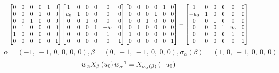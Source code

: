\documentclass[11pt]{article}
\theoremstyle{definition}
\begin{document}
\[
\scaletoalign{\textwidth}{{\left[\begin{matrix}0 & 0 & 0 & 0 & 1 & 0\\0 & 0 & 0 & 1 & 0 & 0\\0 & 0 & 1 & 0 & 0 & 0\\0 & 1 & 0 & 0 & 0 & 0\\1 & 0 & 0 & 0 & 0 & 0\\0 & 0 & 0 & 0 & 0 & 1\end{matrix}\right]} {\left[\begin{matrix}1 & 0 & 0 & 0 & 0 & 0\\u_{0} & 1 & 0 & 0 & 0 & 0\\0 & 0 & 1 & 0 & 0 & 0\\0 & 0 & 0 & 1 & - u_{0} & 0\\0 & 0 & 0 & 0 & 1 & 0\\0 & 0 & 0 & 0 & 0 & 1\end{matrix}\right]} {\left[\begin{matrix}0 & 0 & 0 & 0 & 1 & 0\\0 & 0 & 0 & 1 & 0 & 0\\0 & 0 & 1 & 0 & 0 & 0\\0 & 1 & 0 & 0 & 0 & 0\\1 & 0 & 0 & 0 & 0 & 0\\0 & 0 & 0 & 0 & 0 & 1\end{matrix}\right]} = {\left[\begin{matrix}1 & 0 & 0 & 0 & 0 & 0\\- u_{0} & 1 & 0 & 0 & 0 & 0\\0 & 0 & 1 & 0 & 0 & 0\\0 & 0 & 0 & 1 & u_{0} & 0\\0 & 0 & 0 & 0 & 1 & 0\\0 & 0 & 0 & 0 & 0 & 1\end{matrix}\right]}}
\]
\[
\alpha = \left( -1, \  -1, \  0, \  0, \  0, \  0\right), \beta = \left( 0, \  -1, \  -1, \  0, \  0, \  0\right), \sigma_{\alpha}(\beta) = \left( 1, \  0, \  -1, \  0, \  0, \  0\right)
\]
\[
\scaletoalign{\textwidth}{w_{\alpha} X_{\beta}\left(u_{0}\right) w_{\alpha}^{-1} = X_{\sigma_{\alpha}\left(\beta\right)}\left(- u_{0}\right)}
\]
\end{document}
